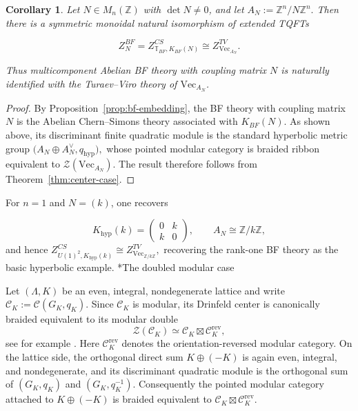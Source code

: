 \documentclass[12pt]{amsart}
\makeatletter
\renewcommand\subsection{\@startsection{subsection}{2}%
  \z@{.5\linespacing\@plus.7\linespacing}{-.5em}%
  {\normalfont\bfseries}}
\numberwithin{equation}{section}
\newtheorem{corollary}[theorem]{Corollary}
\theoremstyle{definition}
\newcommand{\VecCat}{\mathrm{Vec}}
\makeatother
\begin{document}
\begin{corollary}
\label{cor:bf-tv}
Let $N\in M_n(\mathbb Z)$ with $\det N\neq0$, and let $A_N:=\mathbb Z^n/N\mathbb Z^n.$ Then there is a symmetric monoidal natural isomorphism of extended TQFTs

$$
Z_N^{BF}
=
Z^{CS}_{\mathbb T_{BF},K_{BF}(N)}
\cong
Z^{TV}_{\VecCat_{A_N}}.
$$

Thus multicomponent Abelian BF theory with coupling matrix $N$ is naturally identified with the Turaev--Viro theory of $\VecCat_{A_N}$.
\end{corollary}

\begin{proof}
By Proposition~\ref{prop:bf-embedding}, the BF theory with coupling matrix $N$ is the Abelian Chern--Simons theory associated with $K_{BF}(N)$. As shown above, its discriminant finite quadratic module is the standard hyperbolic metric group $\bigl(A_N\oplus A_N^\vee,q_{\mathrm{hyp}}\bigr),$ whose pointed modular category is braided ribbon equivalent to
$\mathcal Z(\VecCat_{A_N})$. The result therefore follows from Theorem~\ref{thm:center-case}.
\end{proof}

For $n=1$ and $N=(k)$, one recovers

$$
K_{\mathrm{hyp}}(k)=
\begin{pmatrix}
0&k\\
k&0
\end{pmatrix},
\qquad
A_N\cong\mathbb Z/k\mathbb Z,
$$
and hence
$
Z^{CS}_{U(1)^2,K_{\mathrm{hyp}}(k)}
\cong
Z^{TV}_{\VecCat_{\mathbb Z/k\mathbb Z}},
$ recovering the rank-one BF theory as the basic hyperbolic example.
\subsection*{The doubled modular case}

Let $(\Lambda,K)$ be an even, integral, nondegenerate lattice and write $\mathcal C_K:=\mathcal C(G_K,q_K).$ Since $\mathcal C_K$ is modular, its Drinfeld center is canonically braided equivalent to its modular double
$$
\mathcal Z(\mathcal C_K)\simeq \mathcal C_K\boxtimes \mathcal C^{\mathrm{rev}}_K,
$$
see for example \cite{DGNO2010}. Here $\mathcal C^{\mathrm{rev}}_K$ denotes the orientation-reversed modular category. On the lattice side, the orthogonal direct sum $K\oplus (-K)$ is again even, integral, and nondegenerate, and its discriminant quadratic module is the orthogonal sum of $(G_K,q_K)$ and $(G_K,q_K^{-1})$. Consequently the pointed modular category attached to $K\oplus(-K)$ is braided equivalent to $\mathcal C_K\boxtimes \mathcal C^{\mathrm{rev}}_K.$
\end{document}
